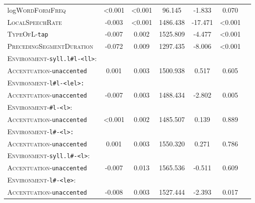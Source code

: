 \begin{table}[H]
{\begin{tabular}{lSSSSSS}
		log\textsc{WordFormFreq }& \color{lsLightGray} <0.001 & \color{lsLightGray} <0.001 & \color{lsLightGray} 96.145 & \color{lsLightGray} -1.833 & \color{lsLightGray} 0.070 \\ 
		
		\textsc{LocalSpeechRate} & -0.003 &<0.001  & 1486.438 & -17.471 &<0.001 \\ 
		
		
		\textsc{TypeOfL}-\texttt{tap} & -0.007 & 0.002 & 1525.809 & -4.477 & <0.001 \\ 
		
		\textsc{PrecedingSegmentDuration} & -0.072 & 0.009 & 1297.435 & -8.006 & <0.001 \\ 
		
		\textsc{Environment}-\texttt{syll.l\#l-<ll>}:&&&&&\\
		\textsc{Accentuation}-\texttt{unaccented} & \color{lsLightGray} 0.001 & \color{lsLightGray} 0.003 & \color{lsLightGray} 1500.938 &\color{lsLightGray}  0.517 & \color{lsLightGray} 0.605 \\ 
		
		\textsc{Environment}-\texttt{l\#l-<lel>:}&&&&&\\
		\textsc{Accentuation}-\texttt{unaccented} & -0.007 & 0.003 & 1488.434 & -2.802 & 0.005 \\
		
		\textsc{Environment}-\texttt{\#l-<l>}:&&&&&\\
		\textsc{Accentuation}-\texttt{unaccented} & \color{lsLightGray} <0.001  & \color{lsLightGray} 0.002 & \color{lsLightGray} 1485.507 & \color{lsLightGray} 0.139 & \color{lsLightGray} 0.889 \\ 
		
		\textsc{Environment}-\texttt{l\#-<l>:}&&&&&\\
		\textsc{Accentuation}-\texttt{unaccented} & \color{lsLightGray} 0.001 & \color{lsLightGray} 0.003 & \color{lsLightGray} 1550.320 &  \color{lsLightGray} 0.271 &\color{lsLightGray}  0.786 \\ 
		
		\textsc{Environment}-\texttt{syll.l\#-<l>}:&&&&&\\
		\textsc{Accentuation}-\texttt{unaccented} &\color{lsLightGray}  -0.007 &\color{lsLightGray}  0.013 & \color{lsLightGray} 1565.536 &\color{lsLightGray}  -0.511 &\color{lsLightGray}  0.609 \\ 
		
		\textsc{Environment}-\texttt{l\#-<le>}:&&&&&\\
		\textsc{Accentuation}-\texttt{unaccented} & -0.008 & 0.003 & 1527.444 & -2.393 & 0.017 \\ 
		

\end{tabular}}
\end{table}
